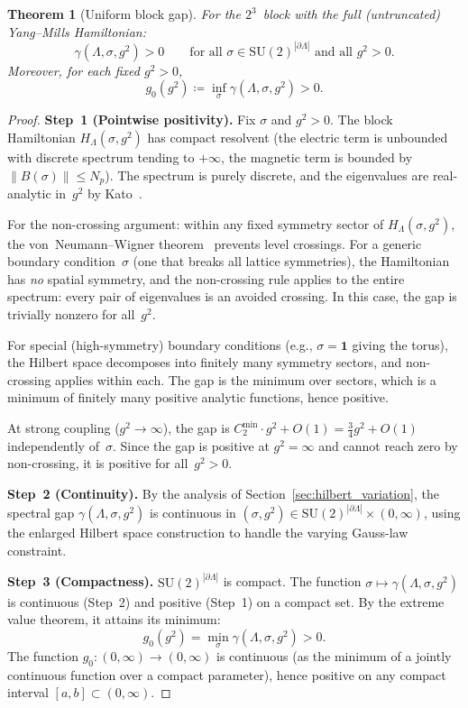 \documentclass[12pt,a4paper]{article}
\newtheorem{theorem}{Theorem}[section]
\begin{document}
\begin{theorem}[Uniform block gap]\label{thm:uniform}
For the $2^3$~block with the full (untruncated) Yang--Mills Hamiltonian:
\begin{equation}
\gamma(\Lambda,\sigma,g^2) > 0 \qquad \text{for all } \sigma\in\mathrm{SU}(2)^{|\partial\Lambda|} \text{ and all } g^2>0.
\end{equation}
Moreover, for each fixed $g^2>0$,
\begin{equation}
g_0(g^2)\coloneqq\inf_\sigma \gamma(\Lambda,\sigma,g^2) > 0.
\end{equation}
\end{theorem}

\begin{proof}
\textbf{Step~1 (Pointwise positivity).} Fix $\sigma$ and $g^2>0$. The block Hamiltonian $H_\Lambda(\sigma,g^2)$ has compact resolvent (the electric term is unbounded with discrete spectrum tending to $+\infty$, the magnetic term is bounded by $\|B(\sigma)\|\le N_p$). The spectrum is purely discrete, and the eigenvalues are real-analytic in~$g^2$ by Kato~\cite{Kato}.

For the non-crossing argument: within any fixed symmetry sector of $H_\Lambda(\sigma,g^2)$, the von~Neumann--Wigner theorem~\cite{vNW} prevents level crossings. For a generic boundary condition~$\sigma$ (one that breaks all lattice symmetries), the Hamiltonian has \emph{no} spatial symmetry, and the non-crossing rule applies to the entire spectrum: every pair of eigenvalues is an avoided crossing. In this case, the gap is trivially nonzero for all~$g^2$.

For special (high-symmetry) boundary conditions (e.g., $\sigma=\mathbf{1}$ giving the torus), the Hilbert space decomposes into finitely many symmetry sectors, and non-crossing applies within each. The gap is the minimum over sectors, which is a minimum of finitely many positive analytic functions, hence positive.

At strong coupling ($g^2\to\infty$), the gap is $C_2^{\min}\cdot g^2 + O(1) = \frac{3}{4}g^2 + O(1)$ independently of~$\sigma$. Since the gap is positive at $g^2=\infty$ and cannot reach zero by non-crossing, it is positive for all~$g^2>0$.

\textbf{Step~2 (Continuity).} By the analysis of Section~\ref{sec:hilbert_variation}, the spectral gap $\gamma(\Lambda,\sigma,g^2)$ is continuous in $(\sigma,g^2)\in\mathrm{SU}(2)^{|\partial\Lambda|}\times(0,\infty)$, using the enlarged Hilbert space construction to handle the varying Gauss-law constraint.

\textbf{Step~3 (Compactness).} $\mathrm{SU}(2)^{|\partial\Lambda|}$ is compact. The function $\sigma\mapsto\gamma(\Lambda,\sigma,g^2)$ is continuous (Step~2) and positive (Step~1) on a compact set. By the extreme value theorem, it attains its minimum:
\begin{equation}
g_0(g^2) = \min_\sigma\gamma(\Lambda,\sigma,g^2) > 0.
\end{equation}
The function $g_0:(0,\infty)\to(0,\infty)$ is continuous (as the minimum of a jointly continuous function over a compact parameter), hence positive on any compact interval $[a,b]\subset(0,\infty)$.
\end{proof}
\end{document}

